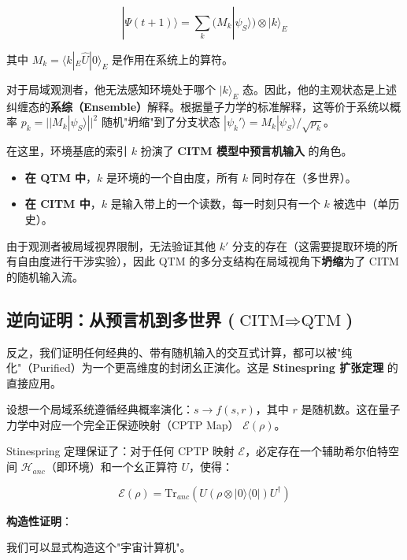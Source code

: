 \begin{equation}
|\Psi(t+1)\rangle = \sum_k (M_k |\psi_S\rangle) \otimes |k\rangle_E
\end{equation}

其中 $M_k = \langle k|_E \hat{U} |0\rangle_E$ 是作用在系统上的算符。

对于局域观测者，他无法感知环境处于哪个 $|k\rangle_E$ 态。因此，他的主观状态是上述纠缠态的\textbf{系综（Ensemble）}解释。根据量子力学的标准解释，这等价于系统以概率 $p_k = || M_k |\psi_S\rangle ||^2$ 随机"坍缩"到了分支状态 $|\psi_k'\rangle = M_k |\psi_S\rangle / \sqrt{p_k}$。

在这里，环境基底的索引 $k$ 扮演了 \textbf{CITM 模型中预言机输入} 的角色。

\begin{itemize}
\item \textbf{在 QTM 中}，$k$ 是环境的一个自由度，所有 $k$ 同时存在（多世界）。

\item \textbf{在 CITM 中}，$k$ 是输入带上的一个读数，每一时刻只有一个 $k$ 被选中（单历史）。
\end{itemize}

由于观测者被局域视界限制，无法验证其他 $k'$ 分支的存在（这需要提取环境的所有自由度进行干涉实验），因此 QTM 的多分支结构在局域视角下\textbf{坍缩}为了 CITM 的随机输入流。

\subsection{逆向证明：从预言机到多世界 ($\text{CITM} \Rightarrow \text{QTM}$)}

反之，我们证明任何经典的、带有随机输入的交互式计算，都可以被"纯化"（Purified）为一个更高维度的封闭幺正演化。这是 \textbf{Stinespring 扩张定理} 的直接应用。

设想一个局域系统遵循经典概率演化：$s \to f(s, r)$，其中 $r$ 是随机数。这在量子力学中对应一个完全正保迹映射（CPTP Map） $\mathcal{E}(\rho)$。

Stinespring 定理保证了：对于任何 CPTP 映射 $\mathcal{E}$，必定存在一个辅助希尔伯特空间 $\mathcal{H}_{anc}$（即环境）和一个幺正算符 $U$，使得：

\begin{equation}
\mathcal{E}(\rho) = \text{Tr}_{anc} (U (\rho \otimes |0\rangle\langle 0|) U^\dagger)
\end{equation}

\textbf{构造性证明}：

我们可以显式构造这个"宇宙计算机"。

